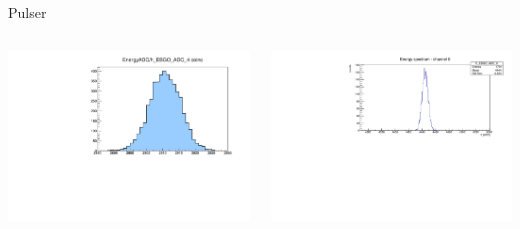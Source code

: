 \documentclass [xcolor=svgnames, 9pt] {beamer}
\begin{document}
\begin{frame}[noframenumbering]{Pulser}
	\begin{columns}
		\begin{column}{0.5\textwidth}
			\includegraphics[width=\textwidth]{img/run1776_coinc_h_EBGO_ADC_4_COINC.pdf}
		\end{column}
		\begin{column}{0.5\textwidth}
			\includegraphics[width=\textwidth]{img/pulser.pdf}
		\end{column}
	\end{columns}
\end{frame}
\end{document}
